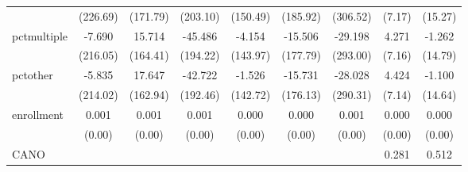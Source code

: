 {\begin{tabular}{l*{8}{c}}
            &                 (226.69)         &                 (171.79)         &                 (203.10)         &                 (150.49)         &                 (185.92)         &                 (306.52)         &                   (7.17)         &                  (15.27)         \\
pctmultiple &                   -7.690         &                   15.714         &                  -45.486         &                   -4.154         &                  -15.506         &                  -29.198         &                    4.271         &                   -1.262         \\
            &                 (216.05)         &                 (164.41)         &                 (194.22)         &                 (143.97)         &                 (177.79)         &                 (293.00)         &                   (7.16)         &                  (14.79)         \\
pctother    &                   -5.835         &                   17.647         &                  -42.722         &                   -1.526         &                  -15.731         &                  -28.028         &                    4.424         &                   -1.100         \\
            &                 (214.02)         &                 (162.94)         &                 (192.46)         &                 (142.72)         &                 (176.13)         &                 (290.31)         &                   (7.14)         &                  (14.64)         \\
enrollment  &                    0.001         &                    0.001         &                    0.001         &                    0.000         &                    0.000         &                    0.001         &                    0.000         &                    0.000         \\
            &                   (0.00)         &                   (0.00)         &                   (0.00)         &                   (0.00)         &                   (0.00)         &                   (0.00)         &                   (0.00)         &                   (0.00)         \\
CANO        &                                  &                                  &                                  &                                  &                                  &                                  &                    0.281         &                    0.512         \\

\end{tabular}}
